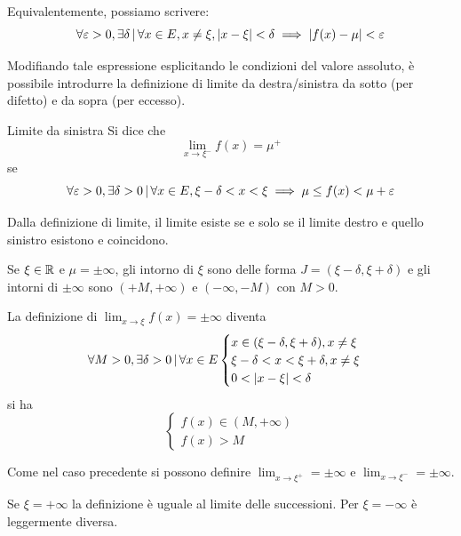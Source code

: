 \documentclass[a4paper]{article}
\begin{document}
\begin{radioactive}
Equivalentemente, possiamo scrivere:
\[\forall \varepsilon > 0, \exists \delta \,|\, \forall x \in E, x \neq \xi, |x-\xi|<\delta \implies |f(x) - \mu| < \varepsilon\]

Modifiando tale espressione esplicitando le condizioni del valore assoluto, è possibile
introdurre la definizione di limite da destra/sinistra da sotto (per difetto)
e da sopra (per eccesso).

\begin{snippetdefinition}{Limite da sinistra}
    Si dice che \[
        \lim_{x \to \xi^-} f(x) = \mu^+
    \]
    se \[
        \forall \varepsilon > 0, \exists \delta > 0 \,|\,
        \forall x \in E, \xi - \delta < x < \xi \implies \mu \leq f(x) < \mu + \varepsilon
    \]
\end{snippetdefinition}

Dalla definizione di limite, il limite esiste se e solo se
il limite destro e quello sinistro esistono e coincidono.

Se \(\xi \in \mathbb{R}\) e \(\mu = \pm \infty\),
gli intorno di \(\xi\) sono delle forma \(J=(\xi - \delta, \xi + \delta)\)
e gli intorni di \(\pm \infty\) sono \((+M, +\infty)\) e \((-\infty, -M)\)
con \(M>0\).

La definizione di \(\lim_{x \to \xi} f(x) = \pm \infty\)
diventa
\[
    \forall M > 0, \exists \delta > 0 \,|\, \forall x \in E
    \begin{cases}
        x \in (\xi - \delta, \xi + \delta), x \neq \xi \\
        \xi - \delta < x < \xi + \delta, x \neq \xi \\
        0 < |x - \xi| < \delta
    \end{cases}
\]
si ha
\[
    \begin{cases}
        f(x) \in (M, +\infty) \\
        f(x) > M
    \end{cases}
\]

Come nel caso precedente si possono definire \(\lim_{x \to \xi^+} = \pm\infty\)
e \(\lim_{x \to \xi^-} = \pm\infty\).

Se \(\xi = +\infty\) la definizione è uguale al limite delle successioni.
Per \(\xi = -\infty\) è leggermente diversa.


\end{radioactive}
\end{document}
